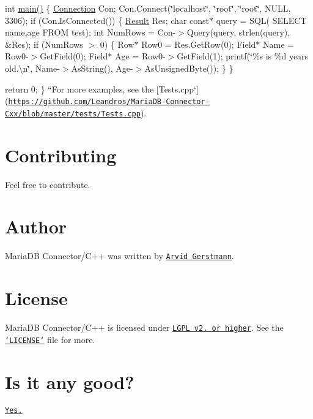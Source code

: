 int \hyperlink{main_8cpp_a0ddf1224851353fc92bfbff6f499fa97}{main()} \{ \hyperlink{class_connection}{Connection} Con; Con.\+Connect(\char`\"{}localhost\char`\"{}, \char`\"{}root\char`\"{}, \char`\"{}root\char`\"{}, N\+U\+L\+L, 3306); if (Con.\+Is\+Connected()) \{ \hyperlink{class_result}{Result} Res; char const$\ast$ query = S\+Q\+L( S\+E\+L\+E\+C\+T {\ttfamily name},{\ttfamily age} F\+R\+O\+M {\ttfamily test}); int Num\+Rows = Con-\/$>$Query(query, strlen(query), \&\+Res); if (Num\+Rows $>$ 0) \{ Row$\ast$ Row0 = Res.\+Get\+Row(0); Field$\ast$ Name = Row0-\/$>$Get\+Field(0); Field$\ast$ Age = Row0-\/$>$Get\+Field(1); printf(\char`\"{}\%s is \%d years old.\textbackslash{}n\char`\"{}, Name-\/$>$As\+String(), Age-\/$>$As\+Unsigned\+Byte()); \} \}

return 0; \} ``{\ttfamily  For more examples, see the \mbox{[}}Tests.\+cpp`\mbox{]}(\href{https://github.com/Leandros/MariaDB-Connector-Cxx/blob/master/tests/Tests.cpp}{\tt https\+://github.\+com/\+Leandros/\+Maria\+D\+B-\/\+Connector-\/\+Cxx/blob/master/tests/\+Tests.\+cpp}).

\section*{Contributing}

Feel free to contribute.

\section*{Author}

Maria\+D\+B Connector/\+C++ was written by \href{https://github.com/Leandros}{\tt Arvid Gerstmann}.

\section*{License}

Maria\+D\+B Connector/\+C++ is licensed under \href{https://github.com/Leandros/MariaDB-Connector-Cxx/blob/master/LICENSE}{\tt L\+G\+P\+L v2. or higher}. See the \href{https://github.com/Leandros/MariaDB-Connector-Cxx/blob/master/LICENSE}{\tt `\+L\+I\+C\+E\+N\+S\+E`} file for more.

\section*{Is it any good?}

\href{https://news.ycombinator.com/item?id=3067434}{\tt Yes.} 